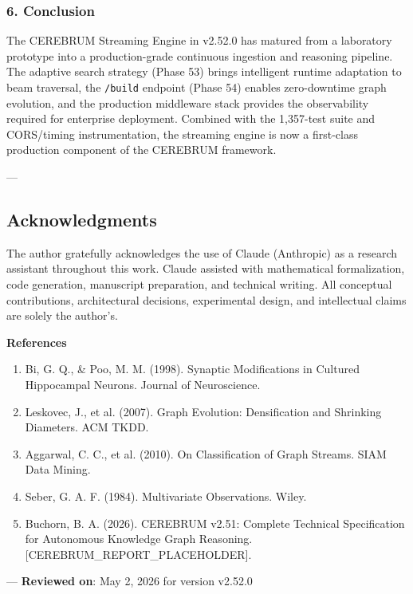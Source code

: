 \subsubsection{6. Conclusion}
The CEREBRUM Streaming Engine in v2.52.0 has matured from a laboratory prototype into a production-grade continuous ingestion and reasoning pipeline. The adaptive search strategy (Phase 53) brings intelligent runtime adaptation to beam traversal, the \texttt{/build} endpoint (Phase 54) enables zero-downtime graph evolution, and the production middleware stack provides the obser\-vability required for enterprise deployment. Combined with the 1,357-test suite and CORS/timing instr\-umentation, the streaming engine is now a first-class production component of the CEREBRUM framework.

---
\subsection{Acknow\-ledgments}

The author gratefully ackno\-wledges the use of Claude (Anthropic) as a research assistant throughout this work. Claude assisted with mathe\-matical forma\-lization, code generation, manuscript preparation, and technical writing. All conceptual contr\-ibutions, archi\-tectural decisions, exper\-imental design, and intel\-lectual claims are solely the author's.

\textbf{References}
\begin{enumerate}
\item Bi, G. Q., \& Poo, M. M. (1998). Synaptic Modifi\-cations in Cultured Hippocampal Neurons. Journal of Neuros\-cience.
\item Leskovec, J., et al. (2007). Graph Evolution: Densif\-ication and Shrinking Diameters. ACM TKDD.
\item Aggarwal, C. C., et al. (2010). On Classi\-fication of Graph Streams. SIAM Data Mining.
\item Seber, G. A. F. (1984). Multiv\-ariate Observ\-ations. Wiley.
\item Buchorn, B. A. (2026). CEREBRUM v2.51: Complete Technical Specif\-ication for Autonomous Knowledge Graph Reasoning. [CEREBRUM\_REPORT\_PLACEHOLDER].

\end{enumerate}
---
\textbf{Reviewed on}: May 2, 2026 for version v2.52.0
